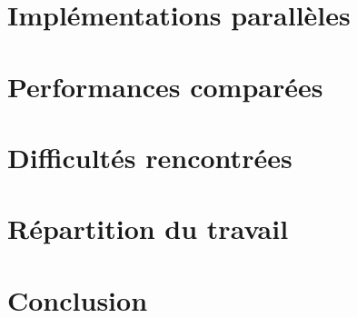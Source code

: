 \documentclass{article}
\begin{document}


\section{Implémentations parallèles}


\section{Performances comparées}


\section{Difficultés rencontrées}

\section{Répartition du travail}


\section{Conclusion}
\end{document}
